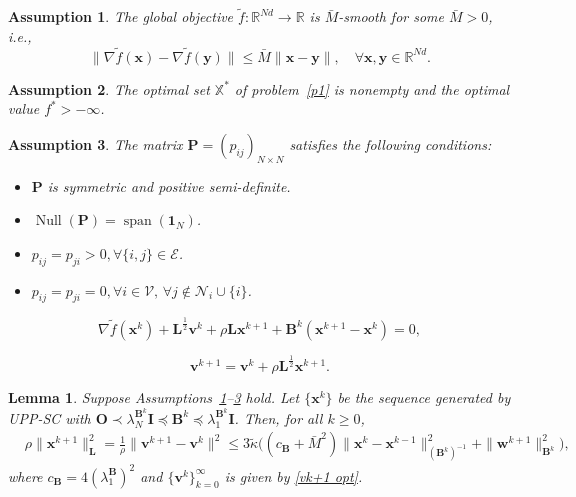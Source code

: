\documentclass[10pt,a4paper]{amsart}
\newtheorem{assumption}{Assumption}
\newtheorem{lemma}{Lemma}
\renewcommand{\Re}{{\mathbb{R}}}
\begin{document}
\begin{assumption}\label{assumption smooth}
The global objective $\tilde{f}:\Re^{Nd}\rightarrow\Re$ is $\bar{M}$-smooth for some $\bar{M}> 0$, i.e.,
\begin{equation}
\|\nabla \tilde{f}(\mathbf{x}) - \nabla \tilde{f}(\mathbf{y})\|\leq \bar{M}\|\mathbf{x}-\mathbf{y}\|,\quad\forall \mathbf{x},\mathbf{y}\in \Re^{Nd}.\label{smooth}
\end{equation}
\end{assumption}

\begin{assumption}\label{assumption: optimality}
The optimal set $\mathbb{X}^*$ of problem~\eqref{p1} is nonempty and the optimal value $f^* >-\infty$.
\end{assumption}

\begin{assumption}\label{assumption: distributed}
    The matrix $\mathbf{P}=(p_{ij})_{N\times N}$ satisfies the following conditions:
    \begin{itemize}
        \item[($\romannumeral1$)] $\mathbf{P}$ is symmetric and positive semi-definite.
        \item[($\romannumeral2$)] $\operatorname{Null}(\mathbf{P})=\operatorname{span}(\mathbf{1}_N)$.
        \item[($\romannumeral3$)] $p_{ij}=p_{ji}>0, \forall \{i,j\}\in \mathcal{E}$.
        \item[($\romannumeral4$)] $p_{ij}=p_{ji}=0, \forall i\in \mathcal{V},\,\forall j\notin \mathcal{N}_i\cup \{i\}$.
    \end{itemize}
\end{assumption}

	\begin{equation}
		\label{first-order opt modified} \nabla \tilde{f}(\mathbf{x}^k) + \mathbf{L}^{\frac{1}{2}}\mathbf{v}^k + \rho \mathbf{L} \mathbf{x}^{k+1}+ \mathbf{B}^k(\mathbf{x}^{k+1} - \mathbf{x}^k)=0,
	\end{equation}

	\begin{equation}
		\mathbf{v}^{k+1}=\mathbf{v}^k+\rho \mathbf{L}^{\frac{1}{2}}\mathbf{x}^{k+1}. \label{vk+1 opt}
	\end{equation}

\begin{lemma} \label{lemma vk+1 - vk}
	Suppose Assumptions~\ref{assumption smooth}--\ref{assumption: distributed} hold. Let $\{\mathbf{x}^k\}$ be the sequence generated by UPP-SC with $\mathbf{O}\prec \lambda_N^{\mathbf{B}^k} \mathbf{I}\preceq \mathbf{B}^{k}\preceq \lambda_1^{\mathbf{B}^k}\mathbf{I} $. Then, for all $k\geq 0$,
	\begin{align}
		&\rho\|\mathbf{x}^{k+1}\|^2_{\mathbf{L}}=\frac{1}{\rho}\|\mathbf{v}^{k+1}-\mathbf{v}^k\|^2\leq 3\tilde{\kappa} \big((c_{\mathbf{B}}+\bar{M}^2)\|\mathbf{x}^k-\mathbf{x}^{k-1}\|^2_{(\mathbf{B}^{k})^{-1}}+\|\mathbf{w}^{k+1}\|^2_{\mathbf{B}^k}\big), \label{vk+1 - vk}
	\end{align}
	where $c_{\mathbf{B}}=4(\lambda_1^\mathbf{B})^2$ and $\{\mathbf{v}^k\}_{k=0}^\infty$ is given by \eqref{vk+1 opt}.
\end{lemma}
\end{document}
